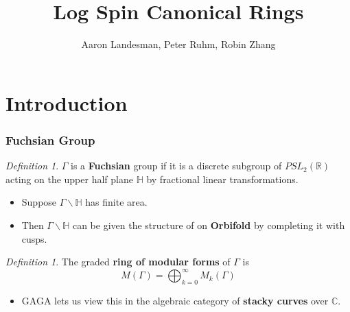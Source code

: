 \documentclass{beamer}
\title{Log Spin Canonical Rings}
\author{Aaron Landesman\inst{1}, Peter Ruhm\inst{2}, Robin Zhang\inst{3}}
\institute[] %
{
  \inst{1}
	Harvard University
	,
  \inst{2}
	Stanford University
  ,
  \inst{3}
	Stanford University
}
\theoremstyle{remark}
\newtheorem{defn}[thm]{Definition}
\newcommand\BH{{\mathbb H}}
\newcommand\BR{{\mathbb R}}
\begin{document}
\begin{frame}
	\titlepage
\end{frame}

\section{Introduction} 

\begin{frame}
\frametitle{Fuchsian Group}

\begin{defn}
$\Gamma$ is a {\bf Fuchsian} group if it is a discrete subgroup of
$PSL_2(\BR)$ acting on the upper half plane $\BH$ by fractional
linear transformations.
\end{defn}
\pause
\begin{itemize}
\item Suppose $\Gamma \backslash \BH$ has finite area. \\
\pause
\item Then $\Gamma \backslash \mathbb{H}$ can be given the structure of on {\bf{Orbifold}} by completing it with cusps.  
\end{itemize}

\end{frame}


\begin{frame}
\begin{defn}
The graded {\bf ring of modular forms} of $\Gamma$ is
\[
   M(\Gamma) = \bigoplus_{k = 0}^\infty M_k(\Gamma)
\]
\end{defn}
\pause 
\begin{itemize}
\item GAGA lets us view this in the algebraic category of {\bf stacky curves} over $\mathbb{C}$.
\end{itemize}

\end{frame}
\end{document}
